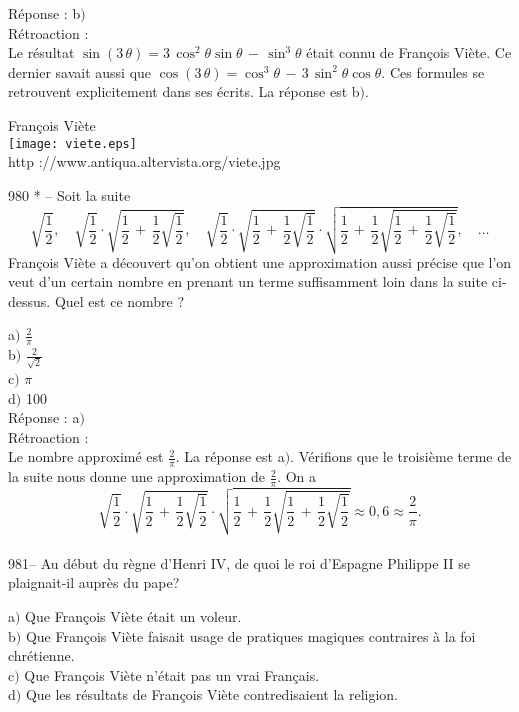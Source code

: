 ﻿\documentclass[letterpaper, 12pt]{article}
\begin{document}
R\'eponse : b$)$\\

R\'etroaction : \\
Le r\'esultat
$\sin(3\,\theta)=3\,\cos^2\theta\sin\theta\,-\,\sin^3\theta$ \'etait
connu de Fran\c cois Vi\`ete. Ce dernier savait aussi que
$\cos(3\,\theta)=\cos^3\theta\,-\,3\,\sin^2\theta\cos\theta$. Ces
formules se retrouvent explicitement dans ses \'ecrits.
La r\'eponse est b$)$.\\

        \begin{center}
        Fran\c cois Vi\`ete\\
    \texttt{[image: viete.eps]}\\
        {\footnotesize http ://www.antiqua.altervista.org/viete.jpg}
    \end{center}

980 * -- Soit la suite
$$\displaystyle\sqrt{\frac12},\quad\displaystyle\sqrt{\frac12}\cdot\displaystyle\sqrt{\frac12\,+\,\frac12\sqrt{\frac12}},\quad
\displaystyle\sqrt{\frac12}\cdot\displaystyle\sqrt{\frac12\,+\,\frac12\sqrt{\frac12}}\cdot
\displaystyle\sqrt{\frac12\,+\,\frac12\sqrt{\frac12\,+\,\frac12\sqrt{\frac12}}},\quad\ldots$$
Fran\c cois Vi\`ete a d\'ecouvert qu'on obtient une approximation
aussi pr\'ecise que l'on veut d'un certain nombre en prenant un
terme suffisamment loin dans la suite ci-dessus. Quel est ce nombre
?

a$)$ $\frac2{\pi}$\\
b$)$ $\frac2{\sqrt2}$ \\
c$)$ $\pi$ \\
d$)$ 100\\

R\'eponse : a$)$\\

R\'etroaction : \\
Le nombre approxim\'e est $\frac2{\pi}$. La r\'eponse est a$)$.
V\'erifions que le troisi\`eme terme de la suite nous donne une
approximation de $\frac{2}{\pi}$. On a
$$\displaystyle\sqrt{\frac12}\cdot\displaystyle\sqrt{\frac12\,+\,\frac12\sqrt{\frac12}}\cdot
\displaystyle\sqrt{\frac12\,+\,\frac12\sqrt{\frac12\,+\,\frac12\sqrt{\frac12}}}\approx0,6\approx\frac2{\pi}.$$
\\

981-- Au d\'ebut du r\`egne d'Henri IV, de quoi le roi d'Espagne
Philippe II se plaignait-il aupr\`es du pape?

a$)$ Que Fran\c cois Vi\`ete \'etait un voleur. \\
b$)$ Que Fran\c cois Vi\`ete faisait usage de pratiques magiques contraires
\`a la foi chr\'etienne. \\
c$)$ Que Fran\c cois Vi\`ete n'\'etait pas un vrai Fran\c cais. \\
d$)$ Que les r\'esultats de Fran\c cois Vi\`ete contredisaient la
religion.\\
\end{document}
